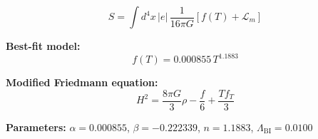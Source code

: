 
\begin{equation}
  S = \int d^4x \, |e| \, \frac{1}{16\pi G} \left[ f(T) + \mathcal{L}_m \right]
\end{equation}

\textbf{Best-fit model:}
\begin{equation}
  f(T) = 0.000855 \, T^{1.1883}
\end{equation}

\textbf{Modified Friedmann equation:}
\begin{equation}
  H^2 = \frac{8\pi G}{3} \rho - \frac{f}{6} + \frac{T f_T}{3}
\end{equation}

\textbf{Parameters:}
$\alpha = 0.000855$, \quad
$\beta = -0.222339$, \quad
$n = 1.1883$, \quad
$\Lambda_{\text{BI}} = 0.0100$